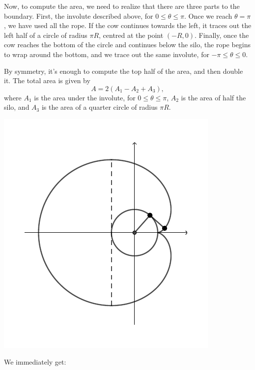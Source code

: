 \documentclass[12pt]{article}
\begin{document}
\begin{multicols}{2}
Now, to compute the area, we need to realize that there are three parts to the boundary. First, the involute described above, for $0\leq \theta\leq \pi$. Once we reach $\theta=\pi$, we have used all the rope. If the cow continues towards the left, it traces out the left half of a circle of radius $\pi R$, centred at the point $(-R,0)$. Finally, once the cow reaches the bottom of the circle and continues below the silo, the rope begins to wrap around the bottom, and we trace out the same involute, for $-\pi\leq \theta\leq 0$.

By symmetry, it's enough to compute the top half of the area, and then double it. The total area is given by
\[
A = 2(A_1 -A_2 +A_3),
\]
where $A_1$ is the area under the involute, for $0\leq \theta\leq \pi$, $A_2$ is the area of half the silo, and $A_3$ is the area of a quarter circle of radius $\pi R$.
\columnbreak
\begin{center}
\includegraphics[width=\columnwidth]{cow-silo3}
\end{center}



\end{multicols}
 We immediately get:
\end{document}
